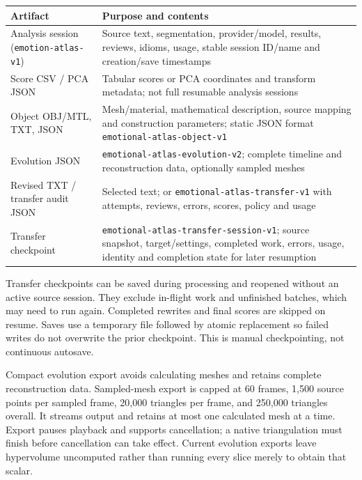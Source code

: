 \documentclass[manuscript,screen,nonacm]{acmart}
\begin{document}
{ %
\begin{longtable}[]{@{}
  >{\raggedright\arraybackslash}p{}
  >{\raggedright\arraybackslash}p{}@{}}
\toprule\noalign{}
\begin{minipage}[b]{\linewidth}\raggedright
Artifact
\end{minipage} & \begin{minipage}[b]{\linewidth}\raggedright
Purpose and contents
\end{minipage} \\
\midrule\noalign{}
\endhead
\bottomrule\noalign{}
\endlastfoot
Analysis session (\nolinkurl{emotion-atlas-v1}) & Source text,
segmentation, provider/model, results, reviews, idioms, usage, stable
session ID/name and creation/save timestamps \\
Score CSV / PCA JSON & Tabular scores or PCA coordinates and transform
metadata; not full resumable analysis sessions \\
Object OBJ/MTL, TXT, JSON & Mesh/material, mathematical description,
source mapping and construction parameters; static JSON format
\nolinkurl{emotional-atlas-object-v1} \\
Evolution JSON & \nolinkurl{emotional-atlas-evolution-v2}; complete
timeline and reconstruction data, optionally sampled meshes \\
Revised TXT / transfer audit JSON & Selected text; or
\nolinkurl{emotional-atlas-transfer-v1} with attempts, reviews, errors,
scores, policy and usage \\
Transfer checkpoint & \nolinkurl{emotional-atlas-transfer-session-v1};
source snapshot, target/settings, completed work, errors, usage,
identity and completion state for later resumption \\
\end{longtable}
}

Transfer checkpoints can be saved during processing and reopened without
an active source session. They exclude in-flight work and unfinished
batches, which may need to run again. Completed rewrites and final
scores are skipped on resume. Saves use a temporary file followed by
atomic replacement so failed writes do not overwrite the prior
checkpoint. This is manual checkpointing, not continuous autosave.

Compact evolution export avoids calculating meshes and retains complete
reconstruction data. Sampled-mesh export is capped at 60 frames, 1,500
source points per sampled frame, 20,000 triangles per frame, and 250,000
triangles overall. It streams output and retains at most one calculated
mesh at a time. Export pauses playback and supports cancellation; a
native triangulation must finish before cancellation can take effect.
Current evolution exports leave hypervolume uncomputed rather than
running every slice merely to obtain that scalar.
\end{document}
